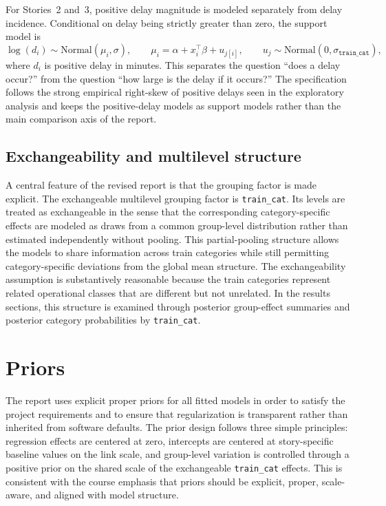 \documentclass[12pt]{article}
\begin{document}
For Stories~2 and~3, positive delay magnitude is modeled separately from delay incidence. Conditional on delay being strictly greater than zero, the support model is
\[
\log(d_i) \sim \mathrm{Normal}(\mu_i, \sigma),
\qquad
\mu_i = \alpha + x_i^\top \beta + u_{j[i]},
\qquad
u_j \sim \mathrm{Normal}(0, \sigma_{\texttt{train\_cat}}),
\]
where \(d_i\) is positive delay in minutes. This separates the question ``does a delay occur?'' from the question ``how large is the delay if it occurs?'' The specification follows the strong empirical right-skew of positive delays seen in the exploratory analysis and keeps the positive-delay models as support models rather than the main comparison axis of the report.

\subsection{Exchangeability and multilevel structure}

A central feature of the revised report is that the grouping factor is made explicit. The exchangeable multilevel grouping factor is \texttt{train\_cat}. Its levels are treated as exchangeable in the sense that the corresponding category-specific effects are modeled as draws from a common group-level distribution rather than estimated independently without pooling. This partial-pooling structure allows the models to share information across train categories while still permitting category-specific deviations from the global mean structure. The exchangeability assumption is substantively reasonable because the train categories represent related operational classes that are different but not unrelated. In the results sections, this structure is examined through posterior group-effect summaries and posterior category probabilities by \texttt{train\_cat}.

\section{Priors}

The report uses explicit proper priors for all fitted models in order to satisfy the project requirements and to ensure that regularization is transparent rather than inherited from software defaults. The prior design follows three simple principles: regression effects are centered at zero, intercepts are centered at story-specific baseline values on the link scale, and group-level variation is controlled through a positive prior on the shared scale of the exchangeable \texttt{train\_cat} effects. This is consistent with the course emphasis that priors should be explicit, proper, scale-aware, and aligned with model structure.
\end{document}
